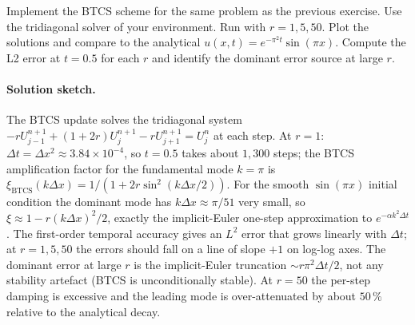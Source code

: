 \begin{exercise}
Implement the BTCS scheme for the same problem as the previous
exercise. Use the tridiagonal solver of your environment. Run
with $r = 1, 5, 50$. Plot the solutions and compare to the
analytical $u(x, t) = e^{-\pi^{2} t}\sin(\pi x)$. Compute the L2
error at $t = 0.5$ for each $r$ and identify the dominant error
source at large $r$.

\paragraph{Solution sketch.}
The BTCS update solves the tridiagonal system $-r U_{j-1}^{n+1} +
(1 + 2 r) U_{j}^{n+1} - r U_{j+1}^{n+1} = U_{j}^{n}$ at each
step. At $r = 1$: $\Delta t = \Delta x^{2} \approx 3.84 \times
10^{-4}$, so $t = 0.5$ takes about $1{,}300$ steps; the BTCS
amplification factor for the fundamental mode $k = \pi$ is
$\xi_{\text{BTCS}}(k\Delta x) = 1/(1 + 2 r \sin^{2}(k\Delta x/2))$.
For the smooth $\sin(\pi x)$ initial condition the dominant
mode has $k\Delta x \approx \pi/51$ very small, so $\xi \approx
1 - r (k\Delta x)^{2}/2$, exactly the implicit-Euler one-step
approximation to $e^{-\alpha k^{2} \Delta t}$. The first-order
temporal accuracy gives an $L^{2}$ error that grows linearly with
$\Delta t$; at $r = 1, 5, 50$ the errors should fall on a line of
slope $+1$ on log-log axes. The dominant error at large $r$ is
the implicit-Euler truncation $\sim r \pi^{2} \Delta t / 2$, not
any stability artefact (BTCS is unconditionally stable). At $r =
50$ the per-step damping is excessive and the leading mode is
over-attenuated by about $50\,\%$ relative to the analytical
decay.
\end{exercise}

